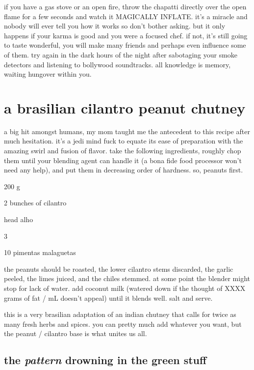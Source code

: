 if you have a gas stove or an open fire, throw the chapatti directly over the 
open flame for a few seconds and watch it MAGICALLY INFLATE. it's a miracle and 
nobody will ever tell you how it works so don't bother asking. but it only 
happens if your karma is good and you were a focused chef. if not, it's still 
going to taste wonderful, you will make many friends and perhaps even influence 
some of them. try again in the dark hours of the night after sabotaging your 
smoke detectors and listening to bollywood soundtracks. all knowledge is 
memory, waiting hungover within you.


\section{a brasilian cilantro peanut chutney}

a big hit amongst humans, my mom taught me the antecedent to this recipe after 
much hesitation. it's a jedi mind fuck to equate its ease of preparation with 
the amazing swirl and fusion of flavor. take the following ingredients, roughly 
chop them until your blending agent can handle it (a bona fide food processor 
won't need any help), and put them in decreasing order of hardness. so, peanuts 
first.

\begin{ingredients}
  \item 200 g 
  \item 2 bunches of cilantro
  \item \onehalf head \gls{alho}
  \item 3 
  \item 10 \gls{pimentas malaguetas}
\end{ingredients}

the peanuts should be roasted, the lower cilantro stems discarded, the garlic 
peeled, the limes juiced, and the chiles stemmed. at some point the blender 
might stop for lack of water. add coconut milk (watered down if the thought of 
XXXX grams of fat / mL doesn't appeal) until it blends well. salt and serve.

this is a very brasilian adaptation of an indian chutney that calls for twice 
as many fresh herbs and spices. you can pretty much add whatever you want, but 
the peanut / cilantro base is what unites us all.

\subsection{the \textit{pattern} drowning in the green stuff}

